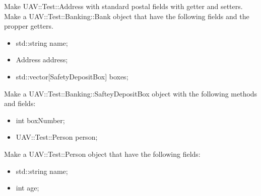 \documentclass[10pt]{exam}
\begin{document}
\begin{questions}
\question Make UAV::Test::Address with standard postal fields with getter and setters.
\question Make a UAV::Test::Banking::Bank object that have the following fields and the propper getters.
\begin{itemize}
\item std::string name;
\item Address address;
\item std::vector[SafetyDepositBox] boxes;
\end{itemize}

\question Make a UAV::Test::Banking::SafteyDepositBox object with the following methods and fields:
\begin{itemize}
\item int boxNumber;
\item UAV::Test::Person person;
\end{itemize}

\question Make a UAV::Test::Person object that have the following fields:
\begin{itemize}
\item std::string name;
\item int age;
\end{itemize}
\end{questions}
\end{document}
